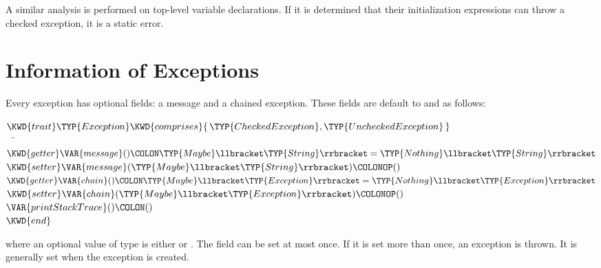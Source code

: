 A similar analysis is performed on top-level variable declarations.
If it is determined that their initialization expressions
can throw a checked exception, it is a static error.

\section{Information of Exceptions}

Every exception has optional fields: a message and a chained exception.
These fields are default to
 and
 as follows:
\begin{Fortress}
\(\KWD{trait} \TYP{Exception} \KWD{comprises} \{\,\TYP{CheckedException}, \TYP{UncheckedException}\,\}\)\\
{\tt~~}\pushtabs\=\+\(  \KWD{getter} \VAR{message}()\COLON \TYP{Maybe}\llbracket\TYP{String}\rrbracket = \TYP{Nothing}\llbracket\TYP{String}\rrbracket\)\\
\(  \KWD{setter} \VAR{message}(\TYP{Maybe}\llbracket\TYP{String}\rrbracket)\COLONOP()\)\\
\(  \KWD{getter} \VAR{chain}()\COLON \TYP{Maybe}\llbracket\TYP{Exception}\rrbracket = \TYP{Nothing}\llbracket\TYP{Exception}\rrbracket\)\\
\(  \KWD{setter} \VAR{chain}(\TYP{Maybe}\llbracket\TYP{Exception}\rrbracket)\COLONOP()\)\\
\(  \VAR{printStackTrace}()\COLON ()\)\-\\\poptabs
\(\KWD{end}\)
\end{Fortress}
where an optional value  of type 
is either  or
.
The  field can be set at most once.  If it is set more than
once, an  exception is thrown.
It is generally set when the exception is created.


